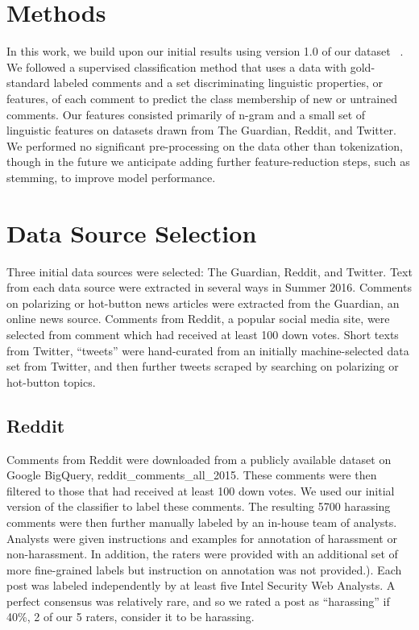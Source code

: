 \documentclass[11pt,a4paper]{article}
\begin{document}
\section{Methods}

In this work, we build upon our initial results using
version 1.0 of our dataset ~\cite{Bastidas:2016}. We followed a supervised classification
method that uses a data with gold-standard labeled
comments and a set discriminating linguistic properties,
or features, of each comment to predict the
class membership of new or untrained comments.
Our features consisted primarily of n-gram
and a small set of linguistic features on datasets
drawn from The Guardian, Reddit, and Twitter. We
performed no significant pre-processing on the
data other than tokenization, though in the future
we anticipate adding further feature-reduction
steps, such as stemming, to improve model performance.

\section{Data Source Selection}

Three initial data sources were selected: The
Guardian, Reddit, and Twitter. Text from each data
source were extracted in several ways in Summer
2016. Comments on polarizing or hot-button news
articles were extracted from the Guardian, an
online news source. Comments from Reddit, a
popular social media site, were selected from comment
which had received at least 100 down votes.
Short texts from Twitter, “tweets” were hand-curated
from an initially machine-selected data set
from Twitter, and then further tweets scraped by
searching on polarizing or hot-button topics.

\subsection{Reddit}
Comments from Reddit were downloaded from a
publicly available dataset on Google BigQuery,
reddit\_comments\_all\_2015. These comments
were then filtered to those that had received at least
100 down votes. We used our initial version of the
classifier to label these comments. The resulting
5700 harassing comments were then further manually
labeled by an in-house team of analysts. Analysts
were given instructions and examples for
annotation of harassment or non-harassment. In
addition, the raters were provided with an additional
set of more fine-grained labels but instruction
on annotation was not provided.). Each post
was labeled independently by at least five Intel Security
Web Analysts. A perfect consensus was relatively
rare, and so we rated a post as “harassing”
if 40\%, 2 of our 5 raters, consider it to be harassing.
\end{document}
